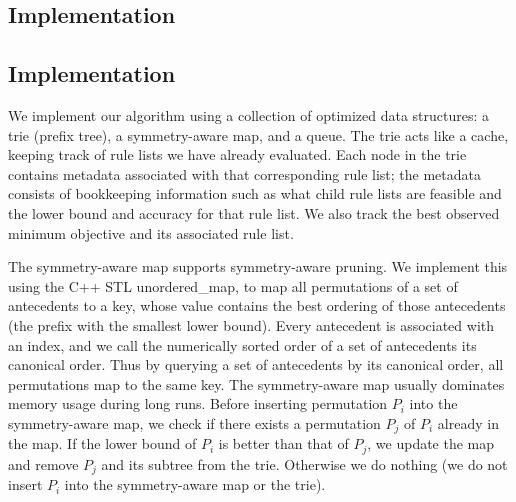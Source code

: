 \begin{kdd}
\section{Implementation}
\label{sec:implementation}
\end{kdd}



\begin{arxiv}
\section{Implementation}
\label{sec:implementation}
\end{arxiv}

We implement our algorithm using a collection of optimized data structures:
a trie (prefix tree), a symmetry-aware map, and a queue.
The trie acts like a cache, keeping track of rule lists we have already evaluated.
Each node in the trie contains metadata associated with that corresponding rule list;
the metadata consists of bookkeeping information such as what child rule lists are feasible and
the lower bound and accuracy for that rule list.
We also track the best observed minimum objective and its associated rule list.

The symmetry-aware map supports symmetry-aware pruning.
%
We implement this using the C++ STL unordered\_map,
to map all permutations of a set of antecedents to a key, whose value
contains the best ordering of those antecedents (\ie the prefix with the smallest lower bound).
%
Every antecedent is associated with an index, and we call the numerically
sorted order of a set of antecedents its canonical order.
%
Thus by querying a set of antecedents by its canonical order, all
permutations map to the same key.
%
%
The symmetry-aware map usually dominates memory usage during long runs.
Before inserting permutation $P_i$ into the symmetry-aware map, we check
if there exists a permutation $P_j$ of $P_i$ already in the map.
If the lower bound of $P_i$ is better than that of $P_j$,
we update the map and remove $P_j$ and its subtree from the trie.
Otherwise we do nothing (\ie we do not insert $P_i$ into the symmetry-aware map
or the trie).

